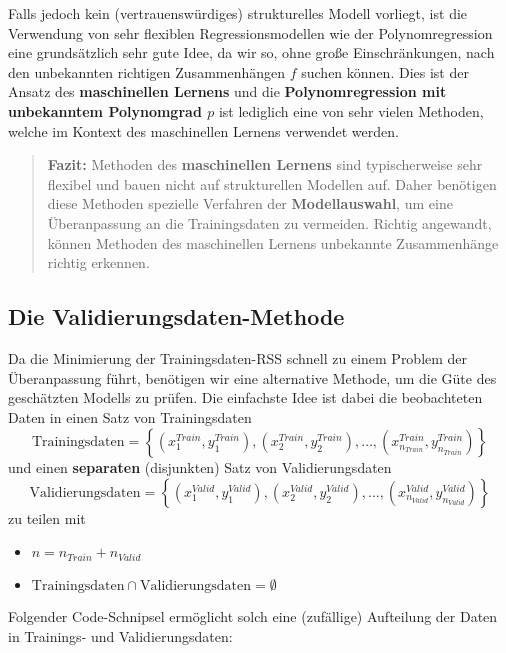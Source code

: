 \documentclass[
  ngerman,
]{book}
\providecommand{\tightlist}{%
  \setlength{\itemsep}{0pt}\setlength{\parskip}{0pt}}
\begin{document}
Falls jedoch kein (vertrauenswürdiges) strukturelles Modell vorliegt, ist die Verwendung von sehr flexiblen Regressionsmodellen wie der Polynomregression eine grundsätzlich sehr gute Idee, da wir so, ohne große Einschränkungen, nach den unbekannten richtigen Zusammenhängen \(f\) suchen können. Dies ist der Ansatz des \textbf{maschinellen Lernens} und die \textbf{Polynomregression mit unbekanntem Polynomgrad \(p\)} ist lediglich eine von sehr vielen Methoden, welche im Kontext des maschinellen Lernens verwendet werden.

\begin{quote}
\textbf{Fazit:} Methoden des \textbf{maschinellen Lernens} sind typischerweise sehr flexibel und bauen nicht auf strukturellen Modellen auf. Daher benötigen diese Methoden spezielle Verfahren der \textbf{Modellauswahl}, um eine Überanpassung an die Trainingsdaten zu vermeiden. Richtig angewandt, können Methoden des maschinellen Lernens unbekannte Zusammenhänge richtig erkennen.
\end{quote}

\hypertarget{die-validierungsdaten-methode}{%
\subsection{Die Validierungsdaten-Methode}\label{die-validierungsdaten-methode}}

Da die Minimierung der Trainingsdaten-RSS schnell zu einem Problem der Überanpassung führt, benötigen wir eine alternative Methode, um die Güte des geschätzten Modells zu prüfen. Die einfachste Idee ist dabei die beobachteten Daten in einen Satz von Trainingsdaten
\[
\text{Trainingsdaten}=\left\{(x_{1}^{Train},y_{1}^{Train}), (x_{2}^{Train},y_{2}^{Train}),\dots,(x_{n_{Train}}^{Train},y_{n_{Train}}^{Train})\right\}
\]
und einen \textbf{separaten} (disjunkten) Satz von Validierungsdaten
\[
\text{Validierungsdaten}=\left\{(x_{1}^{Valid},y_{1}^{Valid}), (x_{2}^{Valid},y_{2}^{Valid}),\dots,(x_{n_{Valid}}^{Valid},y_{n_{Valid}}^{Valid})\right\}
\]
zu teilen mit

\begin{itemize}
\tightlist
\item
  \(n=n_{Train} + n_{Valid}\)
\item
  \(\text{Trainingsdaten}\cap \text{Validierungsdaten} = \emptyset\)
\end{itemize}

Folgender Code-Schnipsel ermöglicht solch eine (zufällige) Aufteilung der Daten in Trainings- und Validierungsdaten:
\end{document}
